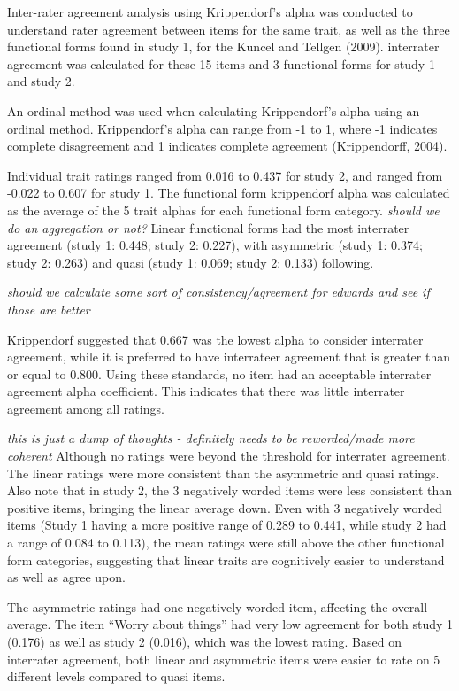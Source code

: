 \documentclass[
  ,jou]{apa6}
\begin{document}
Inter-rater agreement analysis using Krippendorf's alpha was conducted to understand rater agreement between items for the same trait, as well as the three functional forms found in study 1, for the Kuncel and Tellgen (2009). interrater agreement was calculated for these 15 items and 3 functional forms for study 1 and study 2.

An ordinal method was used when calculating Krippendorf's alpha using an ordinal method. Krippendorf's alpha can range from -1 to 1, where -1 indicates complete disagreement and 1 indicates complete agreement (Krippendorff, 2004).

Individual trait ratings ranged from 0.016 to 0.437 for study 2, and ranged from -0.022 to 0.607 for study 1. The functional form krippendorf alpha was calculated as the average of the 5 trait alphas for each functional form category. \emph{should we do an aggregation or not?} Linear functional forms had the most interrater agreement (study 1: 0.448; study 2: 0.227), with asymmetric (study 1: 0.374; study 2: 0.263) and quasi (study 1: 0.069; study 2: 0.133) following.

\emph{should we calculate some sort of consistency/agreement for edwards and see if those are better}

Krippendorf suggested that 0.667 was the lowest alpha to consider interrater agreement, while it is preferred to have interrateer agreement that is greater than or equal to 0.800. Using these standards, no item had an acceptable interrater agreement alpha coefficient. This indicates that there was little interrater agreement among all ratings.

\emph{this is just a dump of thoughts - definitely needs to be reworded/made more coherent}
Although no ratings were beyond the threshold for interrater agreement. The linear ratings were more consistent than the asymmetric and quasi ratings. Also note that in study 2, the 3 negatively worded items were less consistent than positive items, bringing the linear average down. Even with 3 negatively worded items (Study 1 having a more positive range of 0.289 to 0.441, while study 2 had a range of 0.084 to 0.113), the mean ratings were still above the other functional form categories, suggesting that linear traits are cognitively easier to understand as well as agree upon.

The asymmetric ratings had one negatively worded item, affecting the overall average. The item ``Worry about things'' had very low agreement for both study 1 (0.176) as well as study 2 (0.016), which was the lowest rating. Based on interrater agreement, both linear and asymmetric items were easier to rate on 5 different levels compared to quasi items.
\end{document}
